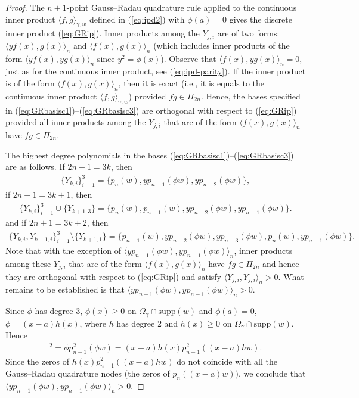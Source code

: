\documentclass{amsart}
\theoremstyle{remark}
\def\la{{\langle}}
\def\ra{{\rangle}}
\def\g{{\gamma}}
\def\la{{\langle}}
\def\ra{{\rangle}}
\begin{document}
\begin{proof}
The $n+1$-point Gauss--Radau quadrature rule applied to the continuous inner product $\la f, g \ra_{\g, w}$ defined in (\ref{eq:ipd2}) with $\phi(a) = 0$ gives the discrete inner product (\ref{eq:GRip}). Inner products among the $Y_{j,i}$ are of two forms: $\la y f(x), g(x) \ra_n$ and $\la f(x), g(x) \ra_n$ (which includes inner products of the form  $\la y f(x), y g(x) \ra_n$ since $y^2 = \phi(x)$). Observe that  $\la f(x),y g(x) \ra_n  = 0$, just as for the continuous inner product, see (\ref{eq:ipd-parity}). If the inner product is of the form $\la f(x), g(x) \ra_n$, then it is exact (i.e., it is equals to the continuous inner product $\la f, g \ra_{\gamma,w}$) provided $f g \in \Pi_{2n}$. Hence, the bases specified in (\ref{eq:GRbasisc1})--(\ref{eq:GRbasisc3}) are orthogonal with respect to (\ref{eq:GRip}) provided all inner products among the $Y_{j,i}$ that are of the form $\la f(x), g(x) \ra_n$ have $fg \in \Pi_{2n}$.

The highest degree polynomials in the bases (\ref{eq:GRbasisc1})--(\ref{eq:GRbasisc3}) are as follows. If $2n + 1 = 3k$, then
\begin{align*}
\lbrace Y_{k,i} \rbrace_{i = 1}^{3} = \lbrace p_n(w), yp_{n-1}(\phi w), yp_{n-2}(\phi w)  \rbrace,
\end{align*}
if $2n + 1 = 3k + 1$, then
\begin{align*}
\lbrace Y_{k,i} \rbrace_{i = 1}^{3}\cup \lbrace Y_{k+1,3} \rbrace = \lbrace p_n(w), p_{n-1}( w), yp_{n-2}(\phi w), yp_{n-1}(\phi w)  \rbrace.
\end{align*}
 and if $2n + 1 = 3k + 2$, then
\begin{align*}
\lbrace Y_{k,i}, Y_{k+1,i} \rbrace_{i = 1}^{3}\setminus \lbrace Y_{k+1,1} \rbrace = \lbrace p_{n-1}(w), yp_{n-2}(\phi w), yp_{n-3}(\phi w), p_{n}(w), yp_{n-1}(\phi w)  \rbrace.
\end{align*}
Note that with the exception of $\la yp_{n-1}(\phi w), yp_{n-1}(\phi w) \ra_n$, inner products among these $Y_{j,i}$ that are of the form $\la f(x), g(x) \ra_n$ have $fg \in \Pi_{2n}$  and hence they are orthogonal with respect to (\ref{eq:GRip}) and satisfy $\la Y_{j,i}, Y_{j,i} \ra_n > 0$. What remains to be established is that $\la yp_{n-1}(\phi w), yp_{n-1}(\phi w) \ra_n > 0$. 

Since $\phi$ has degree $3$, $\phi(x) \geq 0$ on $\Omega_\g \cap \mathrm{supp}(w)$ and $\phi(a) = 0$, $\phi = (x -a)h(x)$, where $h$ has degree $2$ and $h(x) \geq 0$ on $\Omega_\g \cap \mathrm{supp}(w)$. Hence 
\begin{align*}
[yp_{n-1}(\phi w)]^2 = \phi p_{n-1}^2(\phi w) = (x-a)h(x) p_{n-1}^2((x-a)h w).
\end{align*}
Since the zeros of $h(x) p_{n-1}^2((x-a)h w)$ do not coincide with all the Gauss--Radau quadrature nodes (the zeros of $p_n((x-a)w)$), we conclude that $\la yp_{n-1}(\phi w), yp_{n-1}(\phi w) \ra_n > 0$. 
\end{proof}
\end{document}
